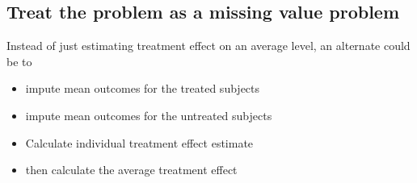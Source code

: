 \documentclass[
]{book}
\providecommand{\tightlist}{%
  \setlength{\itemsep}{0pt}\setlength{\parskip}{0pt}}
\begin{document}
\hypertarget{treat-the-problem-as-a-missing-value-problem}{%
\subsection{Treat the problem as a missing value problem}\label{treat-the-problem-as-a-missing-value-problem}}

Instead of just estimating treatment effect on an average level, an alternate could be to

\begin{itemize}
\tightlist
\item
  impute mean outcomes for the treated subjects
\item
  impute mean outcomes for the untreated subjects
\item
  Calculate individual treatment effect estimate
\item
  then calculate the average treatment effect
\end{itemize}
\end{document}
